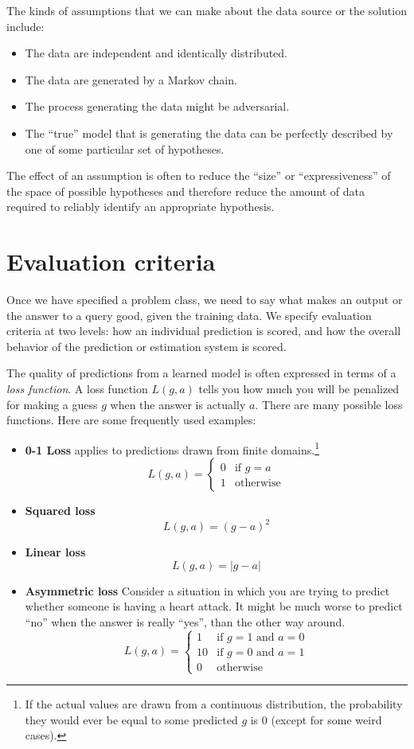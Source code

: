 \documentclass[11pt]{article}
\newcommand{\note}[1]{\todo[color=blue!10,
  linecolor=blue!90,size=\small]{\linespread{0.9}\selectfont{#1}\par}}
\renewcommand{\note}[1]{\footnote{#1}}
\begin{document}
The kinds of assumptions that we can make about the data source or the solution include:
\begin{itemize}
\item The data are independent and identically distributed.
\item The data are generated by a Markov chain.
\item The process generating the data might be adversarial.
\item The ``true'' model that is generating the data can be perfectly described by one of some particular set of hypotheses.
\end{itemize}
The effect of an assumption is often to reduce the ``size'' or
``expressiveness''  of the space
of possible hypotheses and therefore reduce the amount of data
required to reliably identify an appropriate hypothesis.


\section{Evaluation criteria}

Once we have specified a problem class, we need to say what makes an
output or the answer to a query good, given the training data.  We specify evaluation criteria at two levels:  how an individual prediction is scored, and how the overall behavior of the prediction or estimation system is scored.

The quality of predictions from a learned model is often
expressed in terms of a {\em loss function}.  A loss function $L(g,
a)$ tells you how much you will be penalized for making a guess
$g$ when the answer is actually $a$.  There are many possible loss
functions.  Here are some frequently used examples:
\begin{itemize}
\item {\bf 0-1 Loss} applies to predictions drawn from finite
  domains.\note{If the actual values are drawn from a continuous
    distribution, the probability they would ever be equal to some
    predicted $g$ is 0 (except for some weird cases).}
\[L(g, a) = \begin{cases}
         0 & \text{if $g = a$} \\
         1 & \text{otherwise}
\end{cases}\]
\item {\bf Squared loss}
\[L(g, a) = (g - a)^2\]
\item {\bf Linear loss}
\[L(g, a) = |g - a|\]
\item {\bf Asymmetric loss}
Consider a situation in which  you are trying to predict whether
someone is having a heart attack.  It might be much worse to predict
``no'' when the answer is really ``yes'', than the other way around.
\[L(g, a) = \begin{cases}
         1 & \text{if $g = 1$ and $a = 0$} \\
         10 & \text{if $g = 0$ and $a = 1$} \\
         0 & \text{otherwise}
\end{cases}\]
\end{itemize}
\end{document}
